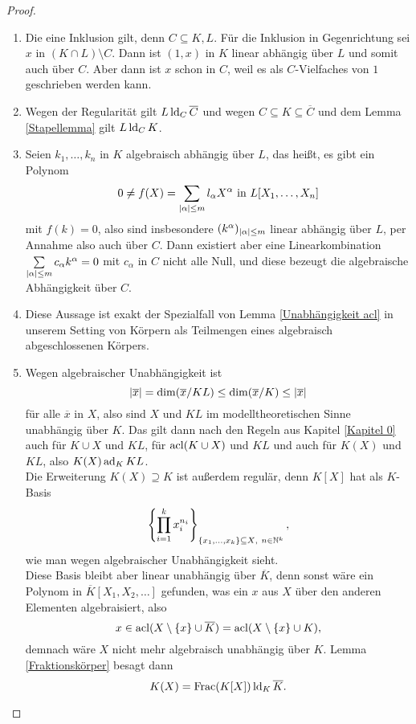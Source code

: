     \begin{proof}
    	\ 
    	\begin{enumerate}
    		\item Die eine Inklusion gilt, denn $C\subseteq K,L$. Für die Inklusion in Gegenrichtung sei $x$ in $(K\cap L)\setminus C$. Dann ist $(1,x)$ in $K$ linear abhängig über $L$ und somit auch über $C$. Aber dann ist $x$ schon in $C$, weil es als $C$-Vielfaches von $1$ geschrieben werden kann.
    		\item Wegen der Regularität gilt $L\operatorname{ld}_C\overline{C}$ und wegen $C\subseteq K\subseteq\overline{C}$ und dem Lemma \ref{Stapellemma} gilt $L\operatorname{ld}_C K$.
    		\item Seien $k_1,\dots,k_n$ in $K$ algebraisch abhängig über $L$, das heißt, es gibt ein Polynom $$0\neq f(X)=\sum\limits_{{\left| \alpha \right|}\leq m}l_\alpha X^\alpha\text{ in }L[X_1,\dots,X_n]$$ mit $f(k)=0$, also sind insbesondere $(k^\alpha)_{{\left| \alpha \right|}\leq m}$ linear abhängig über $L$, per Annahme also auch über $C$. Dann existiert aber eine Linearkombination $\sum\limits_{{\left| \alpha \right|}\leq m}c_\alpha k^\alpha=0$ mit $c_\alpha$ in $C$ nicht alle Null, und diese bezeugt die algebraische Abhängigkeit über $C$.
    		\item Diese Aussage ist exakt der Spezialfall von Lemma \ref{Unabhängigkeit acl} in unserem Setting von Körpern als Teilmengen eines algebraisch abgeschlossenen Körpers.
    		\item Wegen algebraischer Unabhängigkeit ist $${\left| \overline{x} \right|}=\dim(\overline{x}/KL)\leq\dim(\overline{x}/K)\leq{\left| \overline{x} \right|}$$ für alle $\overline{x}$ in $X$, also sind $X$ und $KL$ im modelltheoretischen Sinne unabhängig über $K$. Das gilt dann nach den Regeln aus Kapitel \ref{Kapitel 0} auch für $K\cup X$ und $KL$, für $\operatorname{acl}(K\cup X)$ und $KL$ und auch für $K(X)$ und $KL$, also $K(X)\operatorname{ad}_KKL$.\\
    		Die Erweiterung $K(X)\supseteq K$ ist außerdem regulär, denn $K[X]$ hat als $K$-Basis $$\left\{\prod\limits_{i=1}^kx_i^{n_i}\right\}_{\{x_1,\dots,x_k\}\subseteq X\text,\ n\in\mathbb{N}^k},$$ wie man wegen algebraischer Unabhängigkeit sieht.\\
    		Diese Basis bleibt aber linear unabhängig über $\overline{K}$, denn sonst wäre ein Polynom in $\overline{K}[X_1,X_2,\dots]$ gefunden, was ein $x$ aus $X$ über den anderen Elementen algebraisiert, also $$x\in\operatorname{acl}(X\setminus\{x\}\cup\overline{K})=\operatorname{acl}(X\setminus\{x\}\cup K),$$ demnach wäre $X$ nicht mehr algebraisch unabhängig über $K$. Lemma \ref{Fraktionskörper} besagt dann $$K(X)=\operatorname{Frac}(K[X])\operatorname{ld}_K\overline{K}.$$

\end{enumerate}
\end{proof}
